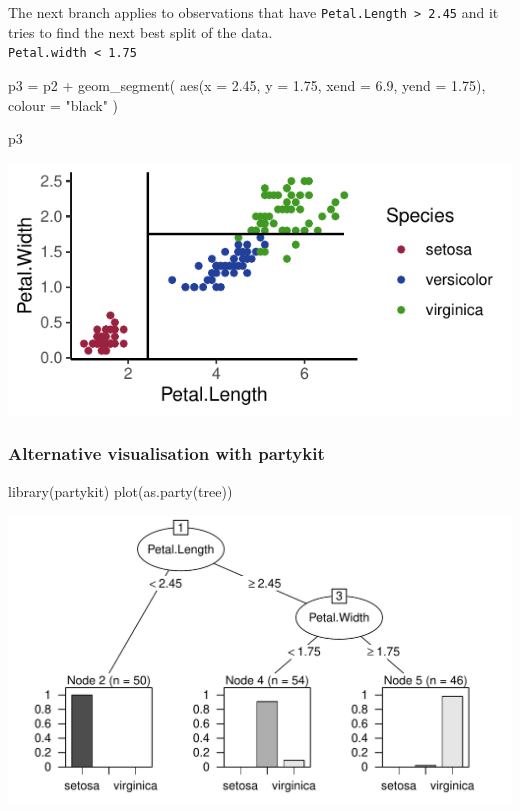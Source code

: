 \documentclass[a4paper]{article}\usepackage[]{graphicx}\usepackage[]{xcolor}
\makeatletter
\def\maxwidth{ %
  \ifdim\Gin@nat@width>\linewidth
    \linewidth
  \else
    \Gin@nat@width
  \fi
}
\makeatother
\begin{document}
The next branch applies to observations that have \lstinline|Petal.Length > 2.45| and it tries to find the next best split of the data.\\
\lstinline|Petal.width < 1.75|
\begin{Schunk}
\begin{Sinput}
p3 = p2 + 
  geom_segment(
    aes(x = 2.45, y = 1.75, 
        xend = 6.9, yend = 1.75),
        colour = "black"
  )

p3
\end{Sinput}


{\centering \includegraphics[width=\maxwidth]{figure/listings-unnamed-chunk-431-1} 

}

\end{Schunk}
\subsubsection{Alternative visualisation with partykit}
\begin{Schunk}
\begin{Sinput}
library(partykit)
plot(as.party(tree))
\end{Sinput}


{\centering \includegraphics[width=\maxwidth]{figure/listings-unnamed-chunk-432-1} 

}

\end{Schunk}
\end{document}
